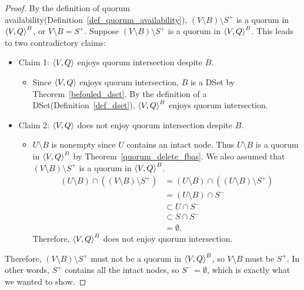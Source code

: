\documentclass[12pt, psamsfonts]{amsart}
\theoremstyle{definition}
\theoremstyle{remark}
\numberwithin{equation}{subsection}
\begin{document}
\begin{proof}
    By the definition of quorum availability(Definition~\ref{def_quorum_availability}), $(V \setminus B) \setminus S^{+}$ is a quorum in $\ev{V, Q}^B$, or $V \setminus B = S^{+}$.
    Suppose $(V \setminus B) \setminus S^{+}$ is a quorum in $\ev{V, Q}^B$.
    This leads to two contradictory claims:
    \begin{itemize}
        \item
            Claim 1: $\ev{V, Q}$ enjoys quorum intersection despite $B$.
            \begin{itemize}
                \item
                    Since $\ev{V, Q}$ enjoys quorum intersection, $B$ is a DSet by Theorem~\ref{befouled_dset}.
                    By the definition of a DSet(Definition~\ref{def_dset}), $\ev{V, Q}^B$ enjoys quorum intersection.
            \end{itemize}
        \item
            Claim 2: $\ev{V, Q}$ does not enjoy quorum intersection despite $B$.
            \begin{itemize}
                \item
                    $U \setminus B$ is nonempty since $U$ contains an intact node.
                    Thus $U \setminus B$ is a quorum in $\ev{V, Q}^B$ by Theorem~\ref{quorum_delete_fbas}.
                    We also assumed that $(V \setminus B) \setminus S^{+}$ is a quorum in $\ev{V, Q}^B$.
                    \begin{align*}
                        (U \setminus B) \cap ((V \setminus B) \setminus S^{+})
                            &= (U \setminus B) \cap ((U \setminus B) \setminus S^{+}) \\
                            &= (U \setminus B) \cap S^{-} \\
                            &\subset U  \cap S^{-} \\
                            &\subset S \cap S^{-} \\
                            &= \emptyset.
                    \end{align*}
                    Therefore, $\ev{V, Q}^B$ does not enjoy quorum intersection.
            \end{itemize}
    \end{itemize}
    Therefore, $(V \setminus B) \setminus S^{+}$ must not be a quorum in $\ev{V, Q}^B$, so $V \setminus B$ must be $S^{+}$.
    In other words, $S^{+}$ contains all the intact nodes, so $S^{-} = \emptyset$, which is exactly what we wanted to show.
\end{proof}
\end{document}
